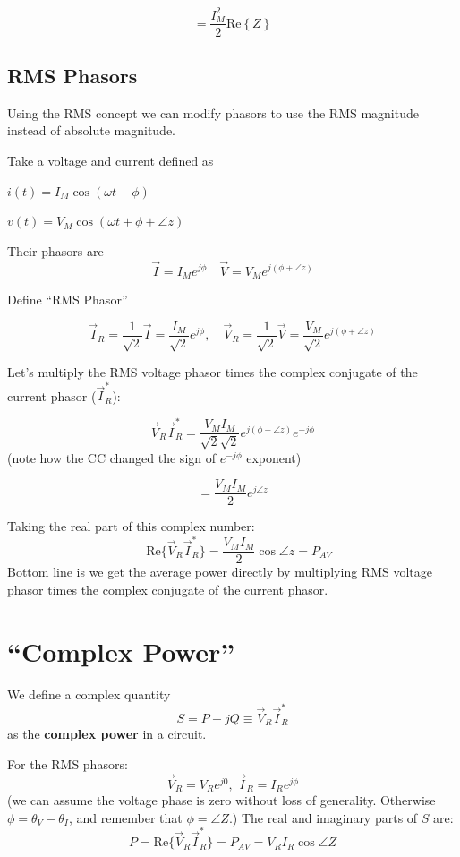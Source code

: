 \[
= \frac{I_M^2}{2} \mathrm{Re}\left\{{Z}\right\}
\]



\subsection{RMS Phasors}   Using the RMS concept we can modify phasors to use
the RMS magnitude instead of absolute magnitude.

Take a voltage and current defined as

$i(t) = I_M \cos(\omega t + \phi)$

$v(t) = V_M \cos(\omega t + \phi + \angle z)$

Their phasors are
\[
\vec{I} = I_M e^{j\phi} \quad \vec{V} = V_M e^{j(\phi + \angle z)}
\]

\noindent Define ``RMS Phasor''

\[
\vec{I}_R = \frac{1}{\sqrt{2}} \vec{I} = \frac{I_M}{\sqrt{2}} e^{j\phi}, \quad \vec{V}_R = \frac{1}{\sqrt{2}} \vec{V} = \frac{V_M}{\sqrt{2}} e^{j(\phi + \angle z)}
\]

Let's multiply the RMS voltage phasor times the complex conjugate of the current
phasor ($\vec I_R^*$):

\[
\vec{V}_R \vec{I}_R^* = \frac{V_M I_M}{\sqrt{2}\sqrt{2}} e^{j(\phi + \angle z)} e^{-j\phi}
\]
(note how the CC changed the sign of $e^{-j\phi}$ exponent)

\[
= \frac{V_M I_M}{2} e^{j\angle z}
\]

Taking the real part of this complex number:
\[
\quad \text{Re}\{\vec{V}_R \vec{I}_R^*\} = \frac{V_M I_M}{2} \cos \angle z = P_{AV}
\]
Bottom line is we get the average power directly by multiplying RMS voltage phasor
times the complex conjugate of the current phasor.






\section{ ``Complex Power''}






We define a complex quantity
\[
S = P + jQ \equiv \vec{V}_R \vec{I}_R^*
\]
as the {\bf complex power} in a circuit.

For the RMS phasors:
\[
\vec V_R = V_Re^{j0},\;\vec I_R=I_Re^{j\phi}
\]
(we can assume the voltage phase is zero without loss of generality. Otherwise
$\phi = \theta_V - \theta_I$, and remember that $\phi = \angle{Z}$.)
The real and imaginary parts of $S$ are:
\[
P = \text{Re}\{\vec{V}_R \vec{I}_R^*\} = P_{AV} = V_R I_R \cos \angle Z
\]

